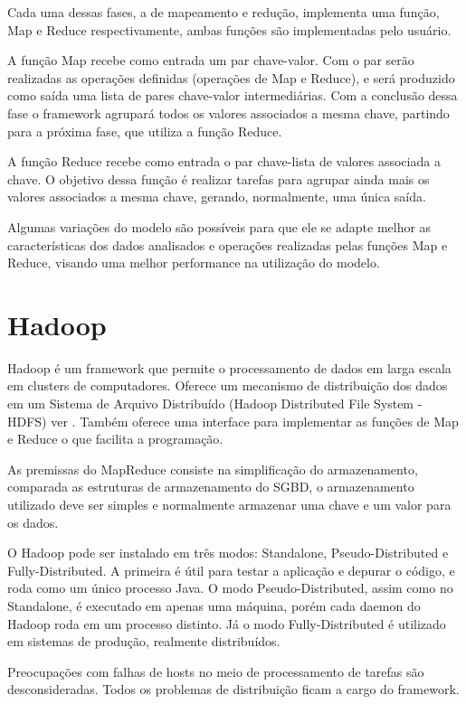 Cada uma dessas fases, a de mapeamento e redução, implementa uma função, Map e 
Reduce respectivamente, ambas funções são implementadas pelo usuário.

A função Map recebe como entrada um par chave-valor. Com o par serão realizadas
as operações definidas (operações de Map e Reduce), e será produzido como saída
uma lista de pares chave-valor intermediárias. Com a conclusão dessa fase o
framework agrupará todos os valores associados a mesma chave, partindo para a
próxima fase, que utiliza a função Reduce.

A função Reduce recebe como entrada o par chave-lista de valores associada a
chave. O objetivo dessa função é realizar tarefas para agrupar ainda mais os
valores associados a mesma chave, gerando, normalmente, uma única saída.

Algumas variações do modelo são possíveis para que ele se adapte melhor as
características dos dados analisados e operações realizadas pelas funções Map e
Reduce, visando uma melhor performance na utilização do modelo. 

\section{\textbf{Hadoop}}

Hadoop \cite{hadoop} é um framework que permite o processamento de dados em
larga escala em clusters de computadores. Oferece um mecanismo de distribuição
dos dados em um Sistema de Arquivo Distribuído (Hadoop Distributed File System - HDFS)
ver \cite{hdfs}. Também oferece uma interface para implementar as funções de Map e 
Reduce o que facilita a programação.

As premissas do MapReduce consiste na simplificação do armazenamento, comparada
as estruturas de armazenamento do SGBD, o armazenamento utilizado deve ser
simples e normalmente armazenar uma chave e um valor para os dados.

O Hadoop pode ser instalado em três modos: Standalone, Pseudo-Distributed e
Fully-Distributed. A primeira é útil para testar a aplicação e depurar o código,
e roda como um único processo Java. O modo Pseudo-Distributed, assim como no
Standalone, é executado em apenas uma máquina, porém cada daemon do Hadoop roda
em um processo distinto. Já o modo Fully-Distributed é utilizado em sistemas de
produção, realmente distribuídos.	

Preocupações com falhas de hosts no meio de processamento de tarefas são
desconsideradas. Todos os problemas de distribuição ficam a cargo do framework.

